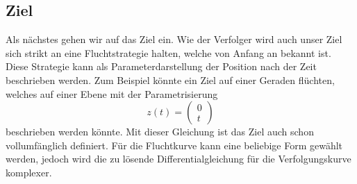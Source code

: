 \subsection{Ziel
\label{lambertw:subsection:Ziel}}
Als nächstes gehen wir auf das Ziel ein.
Wie der Verfolger wird auch unser Ziel sich strikt an eine Fluchtstrategie halten, welche von Anfang an bekannt ist.
Diese Strategie kann als Parameterdarstellung der Position nach der Zeit beschrieben werden.
Zum Beispiel könnte ein Ziel auf einer Geraden flüchten, welches auf einer Ebene mit der Parametrisierung
%
\begin{equation}
    z(t)
    =
    \left( \begin{array}{c} 0 \\  t \end{array} \right)
\end{equation}
%
beschrieben werden könnte.
Mit dieser Gleichung ist das Ziel auch schon vollumfänglich definiert.
Für die Fluchtkurve kann eine beliebige Form gewählt werden, jedoch wird die zu lösende Differentialgleichung für die Verfolgungskurve komplexer.




